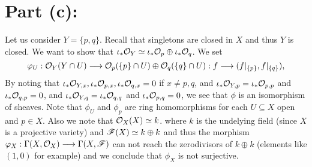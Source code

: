 \documentclass[11pt, a4paper, twoside]{article}
\begin{document}
	
\section*{Part (c):}
Let us consider $Y=\{p,q\}$. Recall that singletons are closed in $X$ and thus $Y$ is closed. We want to show that $\iota_*\mathcal{O}_Y\simeq\iota_*\mathcal{O}_p\oplus\iota_*\mathcal{O}_q$. We set 
\begin{displaymath}
	\varphi_U:\mathcal{O}_Y(Y\cap U)\longrightarrow\mathcal{O}_p(\{p\}\cap U)\oplus\mathcal{O}_q(\{q\}\cap U):f\longrightarrow(f|_{\{p\}},f|_{\{q\}}),
\end{displaymath}
By noting that $\iota_* \mathcal{O}_{Y,x},\iota_* \mathcal{O}_{p,x},\iota_* \mathcal{O}_{q,x}=0$ if $x\neq p,q$, and $\iota_* \mathcal{O}_{Y,p}=\iota_* \mathcal{O}_{p,p}$ and $\iota_* \mathcal{O}_{q,p}=0$, and $\iota_* \mathcal{O}_{Y,q}=\iota_* \mathcal{O}_{q,q}$ and $\iota_* \mathcal{O}_{p,q}=0$, we see that $\phi$ is an isomorphism of sheaves. Note that $\phi_U$ and $\phi_p$ are ring homomorphisms for each $U\subseteq X$ open and $p\in X$. Also we note that $\mathcal{O}_X(X)\simeq k$. where $k$ is the undelying field (since $X$ is a projective variety) and $\mathscr F(X)\simeq k\oplus k$ and thus the morphism $\varphi_X:\Gamma(X,\mathcal{O}_X)\longrightarrow\Gamma(X,\mathscr F)$ can not reach the zerodivisors of $k\oplus k$ (elements like $(1,0)$ for example) and we conclude that $\phi_X$ is not surjective.
\end{document}
